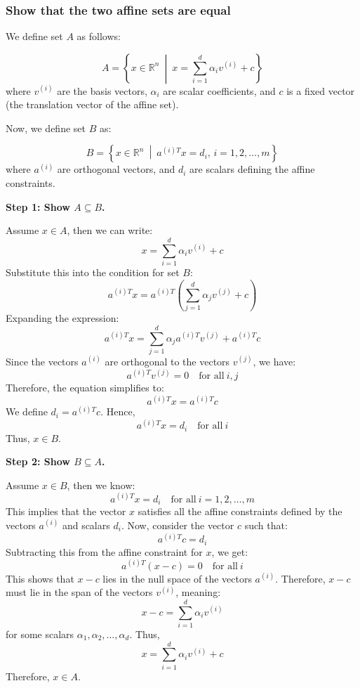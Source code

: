         \subsubsection{Show that the two affine sets are equal}
        \begin{derivation}
            We define set \( A \) as follows:

            \[
            A = \left\{ x \in \mathbb{R}^n \ \middle|\ x = \sum_{i=1}^d \alpha_i v^{(i)} + c \right\}
            \]
            where \( v^{(i)} \) are the basis vectors, \( \alpha_i \) are scalar coefficients, and \( c \) is a fixed vector (the translation vector of the affine set).

            Now, we define set \( B \) as:

            \[
            B = \left\{ x \in \mathbb{R}^n \ \middle|\ a^{(i)T} x = d_i, \, i = 1, 2, \dots, m \right\}
            \]
            where \( a^{(i)} \) are orthogonal vectors, and \( d_i \) are scalars defining the affine constraints.

            \textbf{Step 1: Show \( A \subseteq B \).}

            Assume \( x \in A \), then we can write:
            \[
            x = \sum_{i=1}^d \alpha_i v^{(i)} + c
            \]
            Substitute this into the condition for set \( B \):
            \[
            a^{(i)T} x = a^{(i)T} \left( \sum_{j=1}^d \alpha_j v^{(j)} + c \right)
            \]
            Expanding the expression:
            \[
            a^{(i)T} x = \sum_{j=1}^d \alpha_j a^{(i)T} v^{(j)} + a^{(i)T} c
            \]
            Since the vectors \( a^{(i)} \) are orthogonal to the vectors \( v^{(j)} \), we have:
            \[
            a^{(i)T} v^{(j)} = 0 \quad \text{for all} \ i, j
            \]
            Therefore, the equation simplifies to:
            \[
            a^{(i)T} x = a^{(i)T} c
            \]
            We define \( d_i = a^{(i)T} c \). Hence,
            \[
            a^{(i)T} x = d_i \quad \text{for all} \ i
            \]
            Thus, \( x \in B \).

            \textbf{Step 2: Show \( B \subseteq A \).}

            Assume \( x \in B \), then we know:
            \[
            a^{(i)T} x = d_i \quad \text{for all} \ i = 1, 2, \dots, m
            \]
            This implies that the vector \( x \) satisfies all the affine constraints defined by the vectors \( a^{(i)} \) and scalars \( d_i \). Now, consider the vector \( c \) such that:
            \[
            a^{(i)T} c = d_i
            \]
            Subtracting this from the affine constraint for \( x \), we get:
            \[
            a^{(i)T} (x - c) = 0 \quad \text{for all} \ i
            \]
            This shows that \( x - c \) lies in the null space of the vectors \( a^{(i)} \). Therefore, \( x - c \) must lie in the span of the vectors \( v^{(i)} \), meaning:
            \[
            x - c = \sum_{i=1}^d \alpha_i v^{(i)}
            \]
            for some scalars \( \alpha_1, \alpha_2, \dots, \alpha_d \). Thus,
            \[
            x = \sum_{i=1}^d \alpha_i v^{(i)} + c
            \]
            Therefore, \( x \in A \).


\end{derivation}
